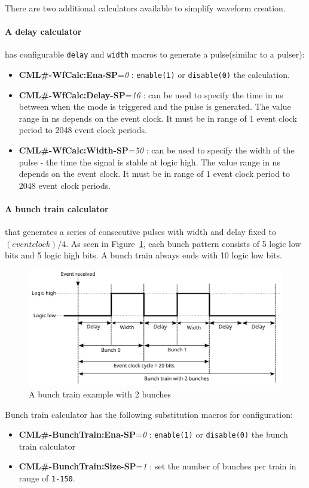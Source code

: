 \documentclass[12pt,a4paper]{article}
\begin{document}
\begin{itemize}
	There are two additional calculators available to simplify waveform creation. 
	\paragraph{A delay calculator} has configurable \texttt{delay} and \texttt{width} macros to generate a pulse(similar to a pulser):
	\begin{itemize}
	\item
	  \textbf{CML\#-WfCalc:Ena-SP}=\emph{0} : \texttt{enable(1)} or \texttt{disable(0)} the calculation.
	\item
	  \textbf{CML\#-WfCalc:Delay-SP}=\emph{16} : can be used to specify the time in ns between when the mode is triggered and the pulse is generated. The value range in ns depends on the event clock. It must be in range of 1 event clock period to 2048 event clock periods.
	\item
	  \textbf{CML\#-WfCalc:Width-SP}=\emph{50} : can be used to specify the width of the pulse - the time the signal is stable at logic high. The value range in ns depends on the event clock. It must be in range of 1 event clock period to 2048 event clock periods.
	\end{itemize}
	
	\paragraph{A bunch train calculator} that generates a series of consecutive pulses with width and delay fixed to $(event clock) / 4$. As seen in Figure~\ref{fig:output_cml_bunch}, each bunch pattern consists of 5 logic low bits and 5 logic high bits. A bunch train always ends with 10 logic low bits.
	\begin{figure}[H]
		\centering
		\includegraphics[width=0.96\columnwidth]{./img/bunchTrain}
		\caption{A bunch train example with 2 bunches}
		\label{fig:output_cml_bunch}
	\end{figure}
	
	Bunch train calculator has the following substitution macros for configuration:
	\begin{itemize}
	\item
	  \textbf{CML\#-BunchTrain:Ena-SP}=\emph{0} : \texttt{enable(1)} or \texttt{disable(0)} the bunch train calculator
	\item
	  \textbf{CML\#-BunchTrain:Size-SP}=\emph{1} : set the number of bunches per train in range of \texttt{1-150}.
	\end{itemize}
	
\end{itemize}
\end{document}
